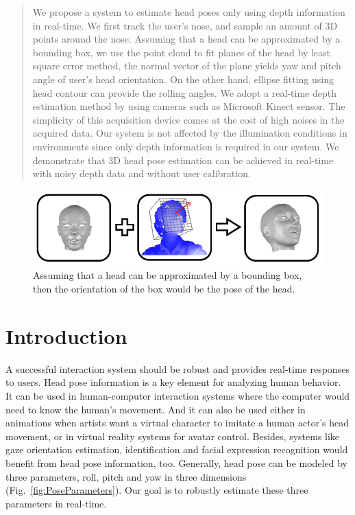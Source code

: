 \begin{abstract}
We propose a system to estimate head poses only using depth information in real-time. We first track the user’s nose, and sample an amount of 3D points around the nose. Assuming that a head can be approximated by a bounding box, we use the point cloud to fit planes of the head by least square error method, the normal vector of the plane yields yaw and pitch angle of user’s head orientation. On the other hand, ellipse fitting using head contour can provide the rolling angles. We adopt a real-time depth estimation method by using cameras such as Microsoft Kinect sensor. The simplicity of this acquisition device comes at the cost of high noises in the acquired data. Our system is not affected by the illumination conditions in environments since only depth information is required in our system. We demonstrate that 3D head pose estimation can be achieved in real-time with noisy depth data and without user calibration.
\end{abstract}

\begin{figure}
\includegraphics[width=1.0\linewidth]{./face1.png}
\caption{Assuming that a head can be approximated by a bounding box, then the orientation of the box would be the pose of the head.}
\label{fig:face}       %
\end{figure}


\section{Introduction}
\label{sec:Intro}
A successful interaction system should be robust and provides real-time responses to users. Head pose information is a key element for analyzing human behavior. It can be used in human-computer interaction systems where the computer would need to know the human's movement. And it can also be used either in animations when artists want a virtual character to imitate a human actor's head movement, or in virtual reality systems for avatar control. Besides, systems like gaze orientation estimation, identification and facial expression recognition would benefit from head pose information, too. Generally, head pose can be modeled by three parameters, roll, pitch and yaw in three dimensions (Fig.~\ref{fig:PoseParameters}). Our goal is to robustly estimate these three parameters in real-time. 

